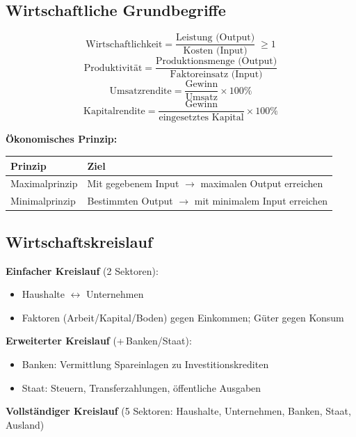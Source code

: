 \documentclass[10pt,a4paper]{article}
\begin{document}
\begin{multicols}{2}

\subsection{Wirtschaftliche Grundbegriffe}

\begin{vwlbox}
\[
\text{Wirtschaftlichkeit} = \frac{\text{Leistung (Output)}}{\text{Kosten (Input)}} \;\geq 1
\]
\[
\text{Produktivität} = \frac{\text{Produktionsmenge (Output)}}{\text{Faktoreinsatz (Input)}}
\]
\[
\text{Umsatzrendite} = \frac{\text{Gewinn}}{\text{Umsatz}} \times 100\%
\]
\[
\text{Kapitalrendite} = \frac{\text{Gewinn}}{\text{eingesetztes Kapital}} \times 100\%
\]
\end{vwlbox}

\textbf{Ökonomisches Prinzip:}

\begin{tabular}{|L{2.5cm}|L{4.5cm}|}
\hline
{}
\textbf{Prinzip} & \textbf{Ziel} \\
\hline
Maximalprinzip & Mit gegebenem Input $\to$ maximalen Output erreichen \\
\hline
Minimalprinzip & Bestimmten Output $\to$ mit minimalem Input erreichen \\
\hline
\end{tabular}

\subsection{Wirtschaftskreislauf}

\textbf{Einfacher Kreislauf} (2 Sektoren):
\begin{itemize}[noitemsep, leftmargin=*]
  \item Haushalte $\leftrightarrow$ Unternehmen
  \item Faktoren (Arbeit/Kapital/Boden) gegen Einkommen; Güter gegen Konsum
\end{itemize}

\textbf{Erweiterter Kreislauf} (+\,Banken/Staat):
\begin{itemize}[noitemsep, leftmargin=*]
  \item Banken: Vermittlung Spareinlagen zu Investitionskrediten
  \item Staat: Steuern, Transferzahlungen, öffentliche Ausgaben
\end{itemize}

\textbf{Vollständiger Kreislauf} (5 Sektoren: Haushalte, Unternehmen, Banken, Staat, Ausland)


\end{multicols}
\end{document}
